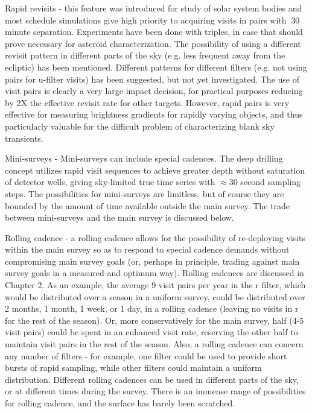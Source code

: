 	Rapid revisits - this feature was introduced for study of solar system bodies and most schedule simulations give high priority to acquiring visits in pairs with $~$30 minute separation.  Experiments have been done with triples, in case that should prove necessary for asteroid characterization.  The possibility of using a different revisit pattern in different parts of the sky (e.g. less frequent away from the ecliptic) has been mentioned.  Different patterns for different filters (e.g. not using pairs for u-filter visits) has been suggested, but not yet investigated.  The use of visit pairs is clearly a very large impact decision, for practical purposes reducing by 2X the effective revisit rate for other targets. However, rapid pairs is very effective for measuring brightness gradients for rapidly varying objects, and thus particularly valuable for the difficult problem of characterizing blank sky transients.
	
	Mini-surveys -  Mini-surveys can include special cadences. The deep drilling concept utilizes rapid visit sequences to achieve greater depth without saturation of detector wells, giving sky-limited true time series with $\approx$30 second sampling steps.  The possibilities for mini-surveys are limitless, but of course they are bounded by the amount of time available outside the main survey. The trade between mini-surveys and the main survey is discussed below.
	
	Rolling cadence - a rolling cadence allows for the possibility of re-deploying visits within the main survey so as to respond to special cadence demands without compromising main survey goals (or, perhaps in principle, trading against main survey goals in a measured and optimum way). Rolling cadences are discussed in Chapter 2.  As an example, the average 9 visit pairs per year in the r filter, which would be distributed over a season in a uniform survey, could be distributed over 2 months, 1 month, 1 week, or 1 day, in a rolling cadence (leaving no visits in r for the rest of the season).  Or, more conservatively for the main survey, half (4-5 visit pairs) could be spent in an enhanced visit rate, reserving the other half to maintain visit pairs in the rest of the season.  Also, a rolling cadence can concern any number of filters - for example, one filter could be used to provide short bursts of rapid sampling, while other filters could maintain a uniform distribution.  Different rolling cadences can be used in different parts of the sky, or at different times during the survey.  There is an immense range of possibilities for rolling cadence, and the surface has barely been scratched.  
	
